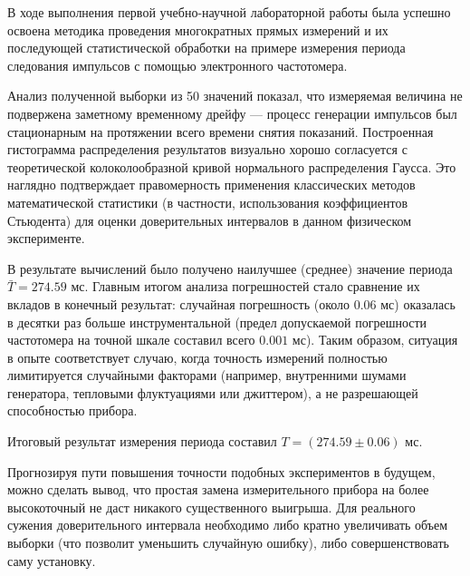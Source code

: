 В ходе выполнения первой учебно-научной лабораторной работы была успешно освоена методика проведения многократных прямых измерений и их последующей статистической обработки на примере измерения периода следования импульсов с помощью электронного частотомера.

Анализ полученной выборки из 50 значений показал, что измеряемая величина не подвержена заметному временному дрейфу — процесс генерации импульсов был стационарным на протяжении всего времени снятия показаний. Построенная гистограмма распределения результатов визуально хорошо согласуется с теоретической колоколообразной кривой нормального распределения Гаусса. Это наглядно подтверждает правомерность применения классических методов математической статистики (в частности, использования коэффициентов Стьюдента) для оценки доверительных интервалов в данном физическом эксперименте.

В результате вычислений было получено наилучшее (среднее) значение периода $\bar{T} = 274.59$ мс. Главным итогом анализа погрешностей стало сравнение их вкладов в конечный результат: случайная погрешность (около $0.06$ мс) оказалась в десятки раз больше инструментальной (предел допускаемой погрешности частотомера на точной шкале составил всего $0.001$ мс). Таким образом, ситуация в опыте соответствует случаю, когда точность измерений полностью лимитируется случайными факторами (например, внутренними шумами генератора, тепловыми флуктуациями или джиттером), а не разрешающей способностью прибора.

Итоговый результат измерения периода составил $T = (274.59 \pm 0.06)$ мс. 

Прогнозируя пути повышения точности подобных экспериментов в будущем, можно сделать вывод, что простая замена измерительного прибора на более высокоточный не даст никакого существенного выигрыша. Для реального сужения доверительного интервала необходимо либо кратно увеличивать объем выборки (что позволит уменьшить случайную ошибку), либо совершенствовать саму установку.
